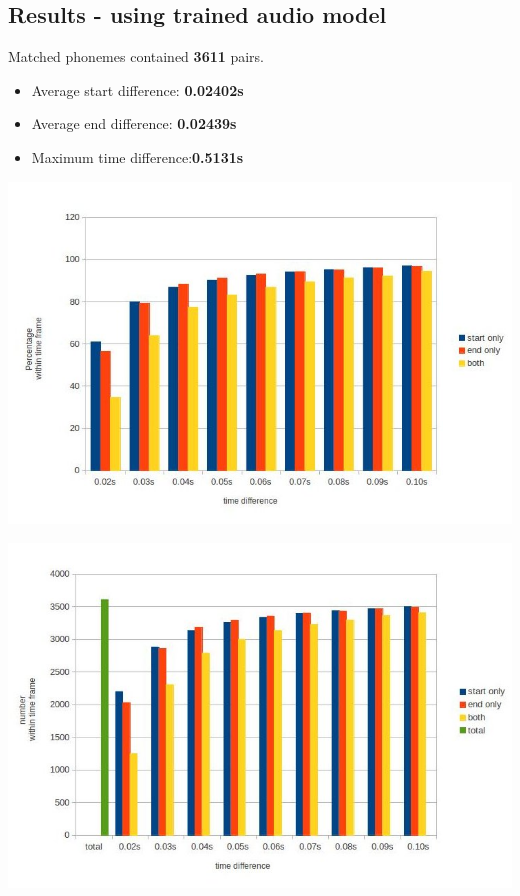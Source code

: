 \documentclass[]{beamer}
\begin{document}
\subsection{Results - using trained audio model}
\begin{frame}
    Matched phonemes contained \textbf{3611} pairs.
    \begin{itemize}
        \item Average start difference: \textbf{0.02402s}
        \item Average end difference: \textbf{0.02439s}
        \item Maximum time difference:\textbf{0.5131s}
    \end{itemize}
\end{frame}
\begin{frame}
    \includegraphics[scale=0.37]{corpora_phoneme_trained_results.jpg}
\end{frame}
\begin{frame}
    \includegraphics[scale=0.37]{corpora_phoneme_trained_counts.jpg}
\end{frame}
\end{document}

